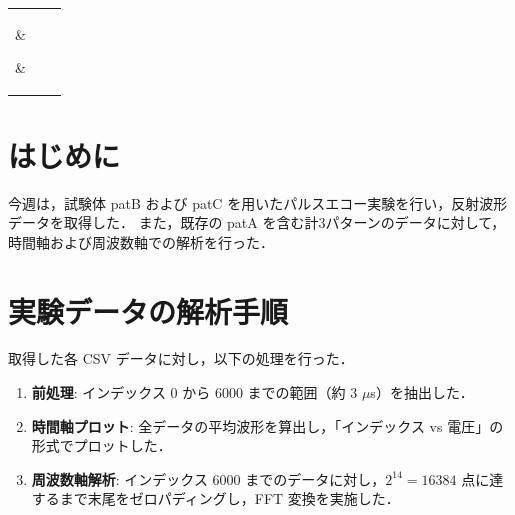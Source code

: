 \documentclass{jarticle}
\begin{document}
%
\begin{center}
 \begin{tabular}{|c|c|c|} \hline
  \parbox{50mm}{\vspace{1mm} } & 
  \parbox{55mm}{\vspace{1mm} } & 
  \parbox{50mm}{\vspace{1mm} }
  \\ [2mm] \hline
%
  \\ [3mm] \hline\hline
%
  \\ [3mm] \hline
 \end{tabular}
%
\end{center}
%
\section{はじめに}
今週は，試験体 patB および patC を用いたパルスエコー実験を行い，反射波形データを取得した．
また，既存の patA を含む計3パターンのデータに対して，時間軸および周波数軸での解析を行った．

\section{実験データの解析手順}
取得した各 CSV データに対し，以下の処理を行った．
\begin{enumerate}
    \item \textbf{前処理}: インデックス 0 から 6000 までの範囲（約 3 $\mu$s）を抽出した．
    \item \textbf{時間軸プロット}: 全データの平均波形を算出し，「インデックス vs 電圧」の形式でプロットした．
    \item \textbf{周波数軸解析}: インデックス 6000 までのデータに対し，$2^{14} = 16384$ 点に達するまで末尾をゼロパディングし，FFT 変換を実施した．
\end{enumerate}
\end{document}
